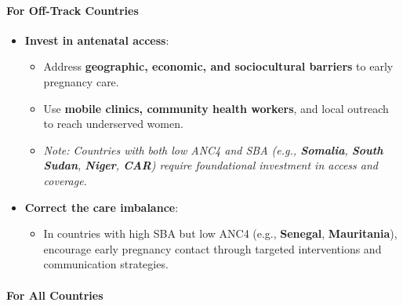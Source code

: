 \documentclass[
]{article}
\providecommand{\tightlist}{%
  \setlength{\itemsep}{0pt}\setlength{\parskip}{0pt}}
\begin{document}
\paragraph{\texorpdfstring{\textbf{For Off-Track
Countries}}{For Off-Track Countries}}\label{for-off-track-countries}

\begin{itemize}
\tightlist
\item
  \textbf{Invest in antenatal access}:

  \begin{itemize}
  \tightlist
  \item
    Address \textbf{geographic, economic, and sociocultural barriers} to
    early pregnancy care.\\
  \item
    Use \textbf{mobile clinics, community health workers}, and local
    outreach to reach underserved women.
  \item
    \emph{Note: Countries with both low ANC4 and SBA (e.g.,
    \textbf{Somalia}, \textbf{South Sudan}, \textbf{Niger},
    \textbf{CAR}) require foundational investment in access and
    coverage.}
  \end{itemize}
\item
  \textbf{Correct the care imbalance}:

  \begin{itemize}
  \tightlist
  \item
    In countries with high SBA but low ANC4 (e.g., \textbf{Senegal},
    \textbf{Mauritania}), encourage early pregnancy contact through
    targeted interventions and communication strategies.
  \end{itemize}
\end{itemize}

\paragraph{\texorpdfstring{\textbf{For All
Countries}}{For All Countries}}\label{for-all-countries}
\end{document}

